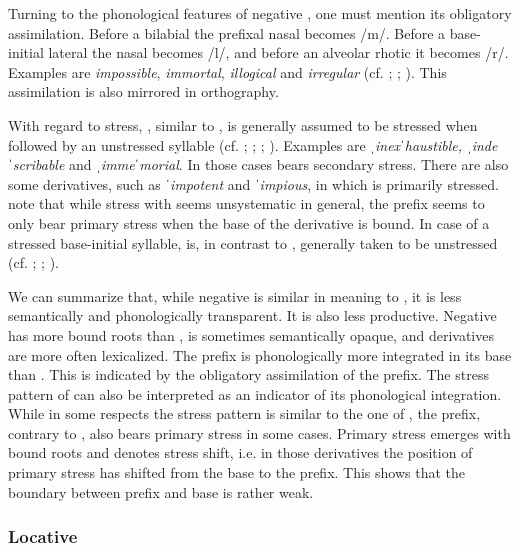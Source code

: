 Turning to the phonological features of negative , one must mention its obligatory assimilation. Before a bilabial the prefixal nasal becomes /m/. Before a base-initial lateral the nasal becomes /l/, and before an alveolar rhotic it becomes /r/. Examples are \textit{impossible}, \textit{immortal}, \textit{illogical} and \textit{irregular} (cf. \citealt[1687]{Bauer.2002}; \citealt[359]{Bauer.2013}; \citealt[123 f]{Okada.2013}). This assimilation is also mirrored in orthography. 

With regard to stress, , similar to , is generally assumed to be stressed when followed by an unstressed syllable (cf. \citealt[473]{Jespersen.1965}; \citealt[381, 384]{Wells.2008};  \citealt[183]{Bauer.2013}; \citealt[126]{Okada.2013}). Examples are \textit{ˌinexˈhaustible, ˌindeˈscribable} and \textit{ˌimmeˈmorial}. In those cases  bears secondary stress. There are also some derivatives, such as \textit{ˈimpotent} and \textit{ˈimpious}, in which  is primarily stressed. \citet[183]{Bauer.2013} note that while  stress with  seems unsystematic in general,  the prefix seems to only bear primary stress when the base of the derivative is bound.
In case of a stressed base-initial syllable,  is, in contrast to , generally taken to be unstressed (cf. \citealt{Wells.2008}; \citealt[183]{Bauer.2013}; \citealt[126]{Okada.2013}). 

We can summarize that, while negative  is similar in meaning to , it is less semantically and phonologically transparent. It is also less productive. Negative  has more bound roots than , is sometimes semantically opaque, and derivatives are more often lexicalized. The prefix is phonologically more integrated in its base than . This is indicated by the obligatory assimilation of the prefix. The stress pattern of  can also be interpreted as an indicator of its phonological integration. While in some respects the stress pattern is similar to the one of , the prefix, contrary to , also bears primary stress in some cases. Primary stress emerges with bound roots and denotes stress shift, i.e. in those derivatives the position of primary stress has shifted from the base to the prefix. This shows that the boundary between prefix and base is rather weak.\\


\subsubsection{Locative } \label{locative in}

